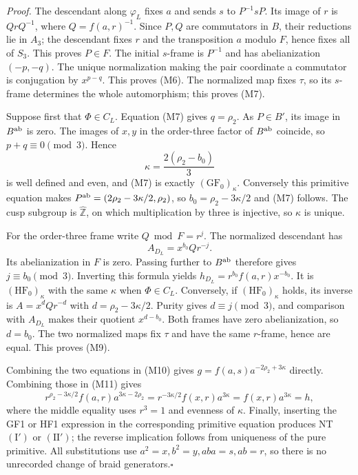 \emph{Proof.} The descendant along $\varphi_L$ fixes $a$ and sends
$s$ to $P^{-1}sP$. Its image of $r$ is $QrQ^{-1}$, where
$Q=f(a,r)^{-1}$. Since $P,Q$ are commutators in $B$, their reductions
lie in $A_3$; the descendant fixes $r$ and the transposition $a$
modulo $F$, hence fixes all of $S_3$. This proves $P\in F$.
The initial $s$-frame is $P^{-1}$ and has abelianization $(-p,-q)$.
The unique normalization making the pair coordinate a commutator
is conjugation by $x^{p-q}$. This proves (M6). The normalized map
fixes $\tau$, so its $s$-frame determines the whole automorphism;
this proves (M7).

Suppose first that $\Phi\in C_L$. Equation (M7) gives $q=\rho_2$.
As $P\in B'$, its image in $B^{\rm ab}$ is zero. The images of
$x,y$ in the order-three factor of $B^{\rm ab}$ coincide, so
$p+q\equiv0\pmod3$. Hence
\[
      \kappa=\frac{2(\rho_2-b_0)}3
\]
is well defined and even, and (M7) is exactly
$(\mathrm{GF}_0)_\kappa$. Conversely this primitive equation makes
$P^{\rm ab}=(2\rho_2-3\kappa/2,\rho_2)$, so
$b_0=\rho_2-3\kappa/2$ and (M7) follows. The cusp subgroup is
$\widehat{\mathbb Z}$, on which multiplication by three is injective,
so $\kappa$ is unique.

For the order-three frame write $Q\bmod F=r^j$.
The normalized descendant has
\[
 A_{D_L}=x^{b_0}Qr^{-j}.
\]
Its abelianization in $F$ is zero. Passing further to $B^{\rm ab}$
therefore gives $j\equiv b_0\pmod3$. Inverting this formula yields
$h_{D_L}=r^{b_0}f(a,r)x^{-b_0}$. It is
$(\mathrm{HF}_0)_\kappa$ with the same $\kappa$ when $\Phi\in C_L$.
Conversely, if $(\mathrm{HF}_0)_\kappa$ holds, its inverse is
$A=x^dQr^{-d}$ with $d=\rho_2-3\kappa/2$. Purity gives
$d\equiv j\pmod3$, and comparison with $A_{D_L}$ makes their
quotient $x^{d-b_0}$. Both frames have zero abelianization, so
$d=b_0$. The two normalized maps fix $\tau$ and have the same
$r$-frame, hence are equal. This proves (M9).

Combining the two equations in (M10) gives
$g=f(a,s)a^{-2\rho_2+3\kappa}$ directly. Combining those in (M11)
gives
\[
 r^{\rho_2-3\kappa/2}f(a,r)a^{3\kappa-2\rho_2}
 =r^{-3\kappa/2}f(x,r)a^{3\kappa}
 =f(x,r)a^{3\kappa}=h,
\]
where the middle equality uses $r^3=1$ and evenness of $\kappa$.
Finally, inserting the GF1 or HF1 expression in the corresponding
primitive equation produces NT $(\mathrm I')$ or $(\mathrm{II}')$;
the reverse implication follows from uniqueness of the pure
primitive. All substitutions use $a^2=x,b^2=y,aba=s,ab=r$, so
there is no unrecorded change of braid generators.\hfill$\square$


